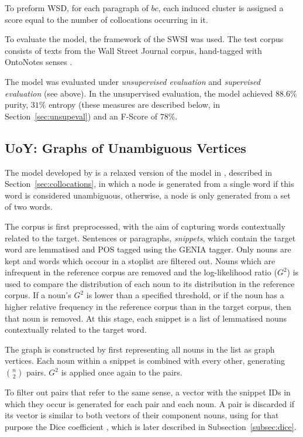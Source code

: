 To preform \ac{WSD}, for each paragraph of $bc$, each induced cluster is
assigned a score equal to the number of collocations occurring in it.

To evaluate the model, the framework of the \ac{SWSI} \citep{agirre2007semeval}
was used. The test corpus consists of texts from the Wall Street Journal
corpus, hand-tagged with OntoNotes senses \citep{hovy2006ontonotes}.

The model was evaluated under \textit{unsupervised evaluation} and 
\textit{supervised evaluation} (see above). In the unsupervised evaluation, the 
model achieved $88.6\%$ purity, $31\%$ entropy (these measures are described 
below, in Section~\ref{sec:unsupeval}) and an F-Score of $78\%$.

\subsection{UoY: Graphs of Unambiguous Vertices}

The model developed by \citet{korkontzelos2010uoy} is a relaxed version of the
model in \citep{klapaftis2008word}, described in Section~\ref{sec:collocations},
in which a node is generated from a single word if this word is considered 
unambiguous, otherwise, a node is only generated from a set of two words.

The corpus is first preprocessed, with the aim of capturing words contextually
related to the target. Sentences or paragraphs, \textit{snippets}, which contain
the target word are lemmatised and \ac{POS} tagged using the GENIA tagger. Only
nouns are kept and words which occour in a stoplist are filtered out. Nouns
which are infrequent in the reference corpus are removed and the log-likelihood
ratio ($G^2$) is used to compare the distribution of each noun to its
distribution in the reference corpus. If a noun's $G^2$ is lower than a
specified threshold, or if the noun has a higher relative frequency in the
reference corpus than in the target corpus, then that noun is removed. At this
stage, each snippet is a list of lemmatised nouns contextually related to the
target word.

The graph is constructed by first representing all nouns in the list as graph
vertices. Each noun within a snippet is combined with every other, generating
$\binom{n}{2}$ pairs. $G^2$ is applied once again to the pairs.

To filter out pairs that refer to the same sense, a vector with the snippet IDs
in which they occur is generated for each pair and each noun. A pair is
discarded if its vector is similar to both vectors of their component nouns,
using for that purpose the Dice coefficient \citep{dice1945measures}, which is 
later described in Subsection~\ref{subsec:dice}.

